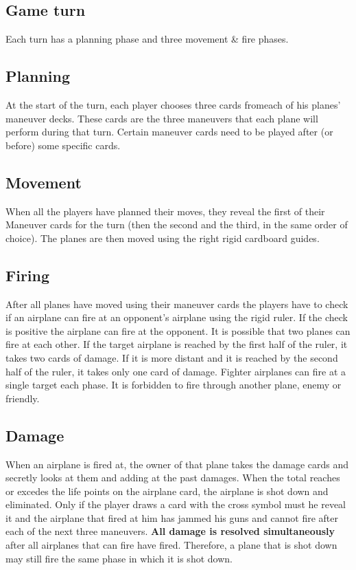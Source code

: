 \subsection{Game turn}
Each turn has a planning phase and three movement \& fire phases.
\subsection{Planning}
 At the start of the turn, each player chooses three cards fromeach of his planes’ maneuver decks. These cards are the three maneuvers that each plane will perform during that turn.
Certain maneuver cards need to be played after (or before) some specific cards.
\subsection{Movement}
When all the players have planned their moves, they reveal the first of their Maneuver cards for the turn (then the second and the third, in the same order of choice).
The planes are then moved using the right rigid cardboard guides.
\subsection{Firing}
After all planes have moved using their maneuver cards the players have to check if an airplane can fire at an opponent’s airplane using the rigid ruler. If the check is positive the airplane can fire at the opponent. It is possible that two planes can fire at each other. 
If the target airplane is reached by the first half of the ruler, it takes two cards of damage. If it is more distant and it is reached by the second half of the ruler, it takes only one card of damage. Fighter airplanes can fire at a single target each phase. It is forbidden to fire through another plane, enemy or friendly.
\subsection{Damage}
When an airplane is fired at, the owner of that plane takes the damage cards and secretly looks at them and adding at the past damages. When the total reaches or excedes the life points on the airplane card, the airplane is shot down and eliminated.
Only if the player draws a card with the cross symbol must he reveal it and the airplane that fired at him has jammed his guns and cannot fire after each of the next three maneuvers.
\textbf{All damage is resolved simultaneously} after all airplanes that can fire have fired. Therefore, a plane that is shot down may still fire the same phase in which it is shot down.
